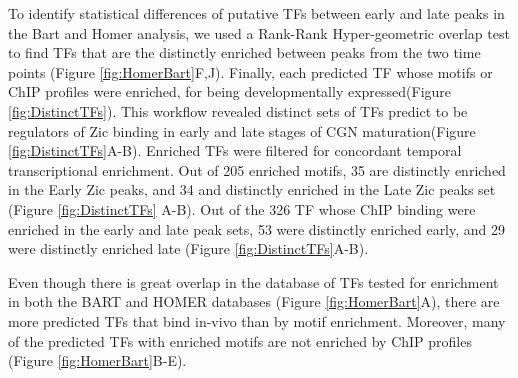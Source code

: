 \documentclass[fleqn,10pt]{wlscirep}
\begin{document}


To identify statistical differences of putative TFs between early and late peaks in the Bart and Homer analysis, we used a Rank-Rank Hyper-geometric  overlap test to find TFs that are the distinctly enriched between peaks from the two time points (Figure \ref{fig:HomerBart}F,J). Finally, each predicted TF whose motifs or ChIP profiles were enriched, for being developmentally expressed(Figure \ref{fig:DistinctTFs}). This workflow revealed distinct sets of TFs predict to be regulators of Zic binding in early and late stages of CGN maturation(Figure \ref{fig:DistinctTFs}A-B). Enriched TFs were filtered for concordant temporal transcriptional enrichment. Out of 205 enriched motifs, 35 are distinctly enriched in the Early Zic peaks, and 34 and distinctly enriched in the Late Zic peaks set (Figure \ref{fig:DistinctTFs} A-B). Out of the 326 TF whose ChIP binding were enriched in the early and late peak sets, 53 were distinctly enriched early, and 29 were distinctly enriched late (Figure \ref{fig:DistinctTFs}A-B).  

Even though there is great overlap in the database of TFs tested for enrichment in both the BART and HOMER databases (Figure \ref{fig:HomerBart}A), there are more predicted TFs that bind in-vivo than by motif enrichment. Moreover, many of the predicted TFs with enriched motifs are not enriched by ChIP profiles (Figure \ref{fig:HomerBart}B-E).
\end{document}
